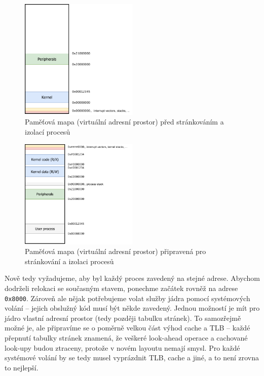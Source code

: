 \documentclass{article}
\begin{document}
\begin{figure}[ht!]
	\centering
	\includegraphics[width=0.5\textwidth]{memmap_old.pdf}
	\caption{Paměťová mapa (virtuální adresní prostor) před stránkováním a izolací procesů}\label{obr:oldmem}
\end{figure}

\begin{figure}[ht!]
	\centering
	\includegraphics[width=0.5\textwidth]{memmap_new.pdf}
	\caption{Paměťová mapa (virtuální adresní prostor) připravená pro stránkování a izolaci procesů}\label{obr:newmem}
\end{figure}

Nově tedy vyžadujeme, aby byl každý proces zavedený na stejné adrese. Abychom dodrželi relokaci se současným stavem, ponechme začátek rovněž na adrese \texttt{0x8000}. Zároveň ale nějak potřebujeme volat služby jádra pomocí systémových volání -- jejich obslužný kód musí být někde zavedený. Jednou možností je mít pro jádro vlastní adresní prostor (tedy později tabulku stránek). To samozřejmě možné je, ale připravíme se o poměrně velkou část výhod cache a TLB -- každé přepnutí tabulky stránek znamená, že veškeré look-ahead operace a cachované look-upy budou ztraceny, protože v novém layoutu nemají smysl. Pro každé systémové volání by se tedy musel vyprázdnit TLB, cache a jiné, a to není zrovna to nejlepší.
\end{document}
